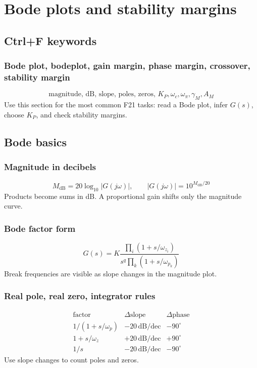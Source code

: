 \section{Bode plots and stability margins}

\subsection{Ctrl+F keywords}

\subsubsection{Bode plot, bodeplot, gain margin, phase margin, crossover, stability margin}
\[
\text{magnitude, dB, slope, poles, zeros, }K_P,\omega_c,\omega_\pi,\gamma_M,A_M
\]
Use this section for the most common F21 tasks: read a Bode plot, infer \(G(s)\), choose \(K_P\), and check stability margins.

\subsection{Bode basics}

\subsubsection{Magnitude in decibels}
\[
M_{\mathrm{dB}}=20\log_{10}|G(j\omega)|,\qquad |G(j\omega)|=10^{M_{\mathrm{dB}}/20}
\]
Products become sums in dB. A proportional gain shifts only the magnitude curve.

\subsubsection{Bode factor form}
\[
G(s)=K\frac{\prod_i(1+s/\omega_{z_i})}{s^q\prod_k(1+s/\omega_{p_k})}
\]
Break frequencies are visible as slope changes in the magnitude plot.

\subsubsection{Real pole, real zero, integrator rules}
\[
\begin{array}{c|c|c}
\text{factor} & \Delta\text{slope} & \Delta\text{phase}\\ \hline
1/(1+s/\omega_p) & -20\,\mathrm{dB/dec} & -90^\circ\\
1+s/\omega_z & +20\,\mathrm{dB/dec} & +90^\circ\\
1/s & -20\,\mathrm{dB/dec} & -90^\circ
\end{array}
\]
Use slope changes to count poles and zeros.


